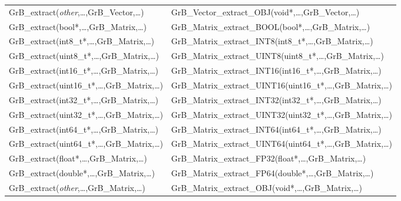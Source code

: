 \begin{table}[htb]
{\begin{tabular}{l|l}
{\sf GrB\_extract(\emph{other},\ldots,GrB\_Vector,\ldots)}	& {\sf GrB\_Vector\_extract\_OBJ(void*,\ldots,GrB\_Vector,\ldots)} \\ 
{\sf GrB\_extract(bool*,\ldots,GrB\_Matrix,\ldots)}		& {\sf GrB\_Matrix\_extract\_BOOL(bool*,\ldots,GrB\_Matrix,\ldots)} \\
{\sf GrB\_extract(int8\_t*,\ldots,GrB\_Matrix,\ldots)}		& {\sf GrB\_Matrix\_extract\_INT8(int8\_t*,\ldots,GrB\_Matrix,\ldots)} \\
{\sf GrB\_extract(uint8\_t*,\ldots,GrB\_Matrix,\ldots)}		& {\sf GrB\_Matrix\_extract\_UINT8(uint8\_t*,\ldots,GrB\_Matrix,\ldots)} \\
{\sf GrB\_extract(int16\_t*,\ldots,GrB\_Matrix,\ldots)}		& {\sf GrB\_Matrix\_extract\_INT16(int16\_t*,\ldots,GrB\_Matrix,\ldots)} \\
{\sf GrB\_extract(uint16\_t*,\ldots,GrB\_Matrix,\ldots)}	& {\sf GrB\_Matrix\_extract\_UINT16(uint16\_t*,\ldots,GrB\_Matrix,\ldots)} \\
{\sf GrB\_extract(int32\_t*,\ldots,GrB\_Matrix,\ldots)}		& {\sf GrB\_Matrix\_extract\_INT32(int32\_t*,\ldots,GrB\_Matrix,\ldots)} \\
{\sf GrB\_extract(uint32\_t*,\ldots,GrB\_Matrix,\ldots)}	& {\sf GrB\_Matrix\_extract\_UINT32(uint32\_t*,\ldots,GrB\_Matrix,\ldots)} \\
{\sf GrB\_extract(int64\_t*,\ldots,GrB\_Matrix,\ldots)}		& {\sf GrB\_Matrix\_extract\_INT64(int64\_t*,\ldots,GrB\_Matrix,\ldots)} \\
{\sf GrB\_extract(uint64\_t*,\ldots,GrB\_Matrix,\ldots)}	& {\sf GrB\_Matrix\_extract\_UINT64(uint64\_t*,\ldots,GrB\_Matrix,\ldots)} \\
{\sf GrB\_extract(float*,\ldots,GrB\_Matrix,\ldots)}		& {\sf GrB\_Matrix\_extract\_FP32(float*,\ldots,GrB\_Matrix,\ldots)} \\
{\sf GrB\_extract(double*,\ldots,GrB\_Matrix,\ldots)}		& {\sf GrB\_Matrix\_extract\_FP64(double*,\ldots,GrB\_Matrix,\ldots)} \\
{\sf GrB\_extract(\emph{other},\ldots,GrB\_Matrix,\ldots)}	& {\sf GrB\_Matrix\_extract\_OBJ(void*,\ldots,GrB\_Matrix,\ldots)} \\ \hline
\end{tabular}
}
\label{Tab:NonPolymorphic2}
\end{table}

